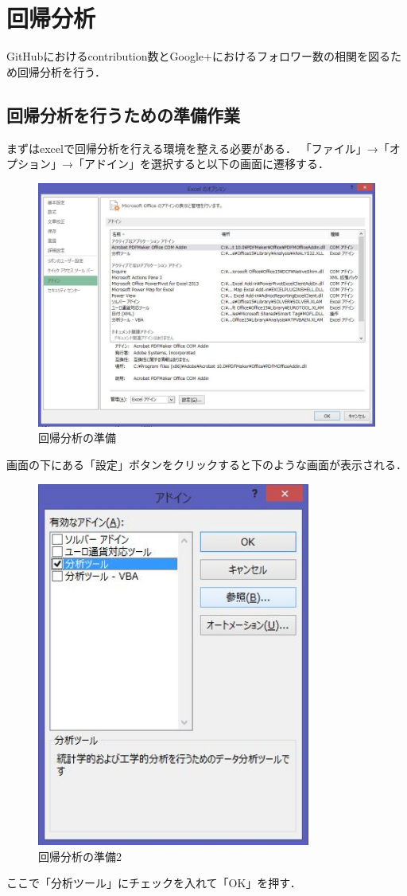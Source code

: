 \newpage

\section{回帰分析}
GitHubにおけるcontribution数とGoogle+におけるフォロワー数の相関を図るため回帰分析を行う．
\subsection{回帰分析を行うための準備作業}

まずはexcelで回帰分析を行える環境を整える必要がある．
「ファイル」→「オプション」→「アドイン」を選択すると以下の画面に遷移する．

\begin{figure}[htb]
\centering
\includegraphics[width=12cm]{adoin.JPG}
\caption{回帰分析の準備}\label{サンプル図}
\end{figure}

画面の下にある「設定」ボタンをクリックすると下のような画面が表示される．
\begin{figure}[htb]
\centering
\includegraphics[height=12cm,width=9cm]{bunnseki.JPG}
\caption{回帰分析の準備2}\label{サンプル図}
\end{figure}
ここで「分析ツール」にチェックを入れて「OK」を押す．

